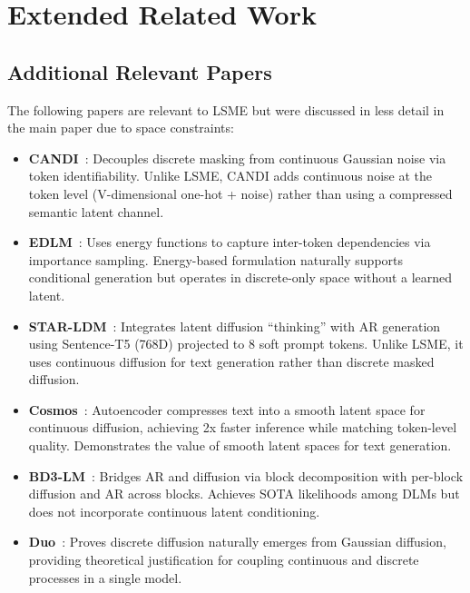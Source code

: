 \documentclass{article}
\begin{document}
\section{Extended Related Work}
\label{app:extended_related}

\subsection{Additional Relevant Papers}

The following papers are relevant to LSME but were discussed in less detail in the main paper due to space constraints:

\begin{itemize}
    \item \textbf{CANDI}~\citep{candi2025}: Decouples discrete masking from continuous Gaussian noise via token identifiability. Unlike LSME, CANDI adds continuous noise at the token level (V-dimensional one-hot + noise) rather than using a compressed semantic latent channel.

    \item \textbf{EDLM}~\citep{xu2025edlm}: Uses energy functions to capture inter-token dependencies via importance sampling. Energy-based formulation naturally supports conditional generation but operates in discrete-only space without a learned latent.

    \item \textbf{STAR-LDM}~\citep{lovelace2025starlm}: Integrates latent diffusion ``thinking'' with AR generation using Sentence-T5 (768D) projected to 8 soft prompt tokens. Unlike LSME, it uses continuous diffusion for text generation rather than discrete masked diffusion.

    \item \textbf{Cosmos}~\citep{meshchaninov2025}: Autoencoder compresses text into a smooth latent space for continuous diffusion, achieving 2x faster inference while matching token-level quality. Demonstrates the value of smooth latent spaces for text generation.

    \item \textbf{BD3-LM}~\citep{arriola2025bd3lm}: Bridges AR and diffusion via block decomposition with per-block diffusion and AR across blocks. Achieves SOTA likelihoods among DLMs but does not incorporate continuous latent conditioning.

    \item \textbf{Duo}~\citep{sahoo2025duo}: Proves discrete diffusion naturally emerges from Gaussian diffusion, providing theoretical justification for coupling continuous and discrete processes in a single model.
\end{itemize}
\end{document}
